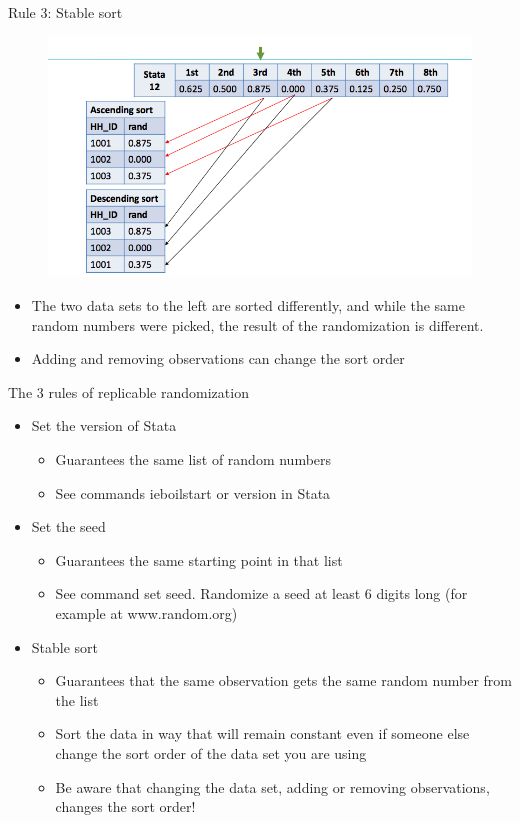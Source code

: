 \documentclass[aspectratio=169]{beamer}
\begin{document}
\begin{frame}{Rule 3: Stable sort}
\begin{multicols}{2}	
\begin{figure}
	\centering
	\includegraphics[width=\linewidth]{img/rule3}
\end{figure}
\begin{itemize}
	\item The two data sets to the left are sorted differently, and while the same random numbers were picked, the result of the randomization is different.
	\item Adding and removing observations can change the sort order
\end{itemize}
\end{multicols}
\end{frame}


\begin{frame}{The 3 rules of replicable randomization}
\begin{itemize}
	\item Set the version of Stata
		\begin{itemize}
			\item Guarantees the same list of random numbers
			\item See commands ieboilstart or version in Stata
		\end{itemize}
	\item Set the seed 
		\begin{itemize}
			\item 	Guarantees the same starting point in that list
			\item See command set seed. Randomize a seed at least 6 digits long (for example at www.random.org)
		\end{itemize}
	\item Stable sort
		\begin{itemize}
			\item Guarantees that the same observation gets the same random number from the list
			\item Sort the data in way that will remain constant even if someone else change the sort order of the data set you are using
			\item Be aware that changing the data set, adding or removing observations, changes the sort order!
		\end{itemize}
\end{itemize}
\end{frame}
\end{document}
